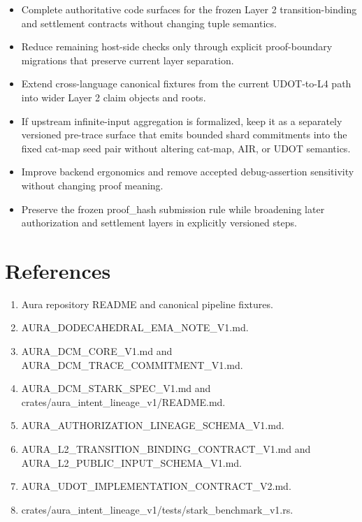 \documentclass[conference]{IEEEtran}
\begin{document}
\begin{itemize}
\item Complete authoritative code surfaces for the frozen Layer 2 transition-binding and settlement contracts without changing tuple semantics.
\item Reduce remaining host-side checks only through explicit proof-boundary migrations that preserve current layer separation.
\item Extend cross-language canonical fixtures from the current UDOT-to-L4 path into wider Layer 2 claim objects and roots.
\item If upstream infinite-input aggregation is formalized, keep it as a separately versioned pre-trace surface that emits bounded shard commitments into the fixed cat-map seed pair without altering cat-map, AIR, or UDOT semantics.
\item Improve backend ergonomics and remove accepted debug-assertion sensitivity without changing proof meaning.
\item Preserve the frozen proof\_hash submission rule while broadening later authorization and settlement layers in explicitly versioned steps.
\end{itemize}
\section{References}
\begin{enumerate}
\item Aura repository README and canonical pipeline fixtures.
\item AURA\_DODECAHEDRAL\_EMA\_NOTE\_V1.md.
\item AURA\_DCM\_CORE\_V1.md and AURA\_DCM\_TRACE\_COMMITMENT\_V1.md.
\item AURA\_DCM\_STARK\_SPEC\_V1.md and crates/aura\_intent\_lineage\_v1/README.md.
\item AURA\_AUTHORIZATION\_LINEAGE\_SCHEMA\_V1.md.
\item AURA\_L2\_TRANSITION\_BINDING\_CONTRACT\_V1.md and AURA\_L2\_PUBLIC\_INPUT\_SCHEMA\_V1.md.
\item AURA\_UDOT\_IMPLEMENTATION\_CONTRACT\_V2.md.
\item crates/aura\_intent\_lineage\_v1/tests/stark\_benchmark\_v1.rs.
\end{enumerate}
\end{document}
